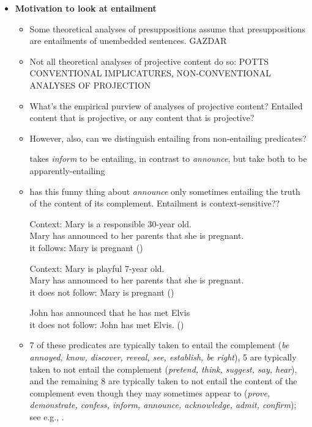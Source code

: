 \documentclass[11pt,fleqn]{article}
\newcommand{\6}{\mbox{$[\hspace*{-.6mm}[$}}
\newcommand{\9}{\mbox{$]\hspace*{-.6mm}]$}}
\begin{document}
\begin{itemize}
\item {\bf Motivation to look at entailment}

\begin{itemize}

\item Some theoretical analyses of presuppositions assume that presuppositions are entailments of unembedded sentences. GAZDAR

\item Not all theoretical analyses of projective content do so: POTTS CONVENTIONAL IMPLICATURES, NON-CONVENTIONAL ANALYSES OF PROJECTION

\item What's the empirical purview of analyses of projective content? Entailed content that is projective, or any content that is projective?

\item However, also, can we distinguish entailing from non-entailing predicates? 

\citealt{schlenker10} takes {\em inform} to be entailing, in contrast to {\em announce}, but \citealt{anand-hacquard2014} take both to be apparently-entailing

\item \citealt{schlenker10} has this funny thing about {\em announce} only sometimes entailing the truth of the content of its complement. Entailment is context-sensitive??

\begin{exe}
\ex 
\begin{xlist}
\ex Context: Mary is a responsible 30-year old. 
\\ Mary has announced to her parents that she is pregnant. 
\\ it follows: Mary is pregnant \hfill (\citealt[139]{schlenker10})

\ex Context: Mary is playful 7-year old.
\\ Mary has announced to her parents that she is pregnant. 
\\ it does not follow: Mary is pregnant \hfill (\citealt[140]{schlenker10})

\ex John has announced that he has met Elvis
\\ it does not follow: John has met Elvis. \hfill (\citealt[140]{schlenker10})
\end{xlist}
\end{exe}

\item 7 of these predicates are typically taken to entail the complement ({\em be annoyed, know, discover, reveal, see, establish, be right}), 5 are typically taken to not entail the complement ({\em pretend, think, suggest, say, hear}), and the remaining 8 are typically taken to not entail the content of the complement even though they may sometimes appear to ({\em prove, demonstrate, confess, inform, announce, acknowledge, admit, confirm}); see e.g., \citealt{schlenker10,swanson2012,anand-hacquard2014}.


\end{itemize}
\end{itemize}
\end{document}
